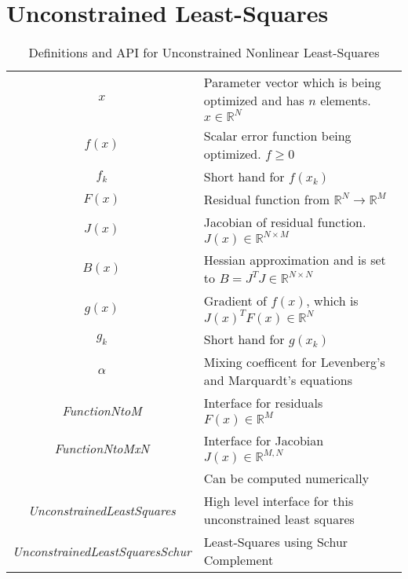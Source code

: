 \documentclass[peerreview,compsoc,onecolumn]{IEEEtran}
\newcommand{\R}{\mathbb{R}}
\begin{document}
\section{Unconstrained Least-Squares}
\begin{table*}[h]
\caption{\label{definitions:UNLS}Definitions and API for Unconstrained Nonlinear Least-Squares}
\centering
\begin{tabular}{cl}
$x$ & Parameter vector which is being optimized and has $n$ elements. $x \in \R^N$ \\
$f(x)$ & Scalar error function being optimized. $f \ge 0$ \\
$f_k$ & Short hand for $f(x_k)$ \\
$F(x)$ & Residual function from $\R^N \rightarrow \R^M$ \\
$J(x)$ & Jacobian of residual function. $J(x) \in \R^{N \times M}$\\
$B(x)$ & Hessian approximation and is set to $B=J^TJ \in \R^{N \times N}$ \\
$g(x)$ & Gradient of $f(x)$, which is $J(x)^T  F(x) \in \R^{N}$ \\
$g_k$ & Short hand for $g(x_k)$ \\
$\alpha$ & Mixing coefficent for Levenberg's and Marquardt's equations \\
\textit{FunctionNtoM} & Interface for residuals $F(x) \in \R^M$ \\
\textit{FunctionNtoMxN} & Interface for Jacobian $J(x) \in \R^{M,N}$ \\
& Can be computed numerically \\
\textit{UnconstrainedLeastSquares} & High level interface for this unconstrained least squares \\
\textit{UnconstrainedLeastSquaresSchur} & Least-Squares using Schur Complement
\end{tabular}
\end{table*}
\end{document}
